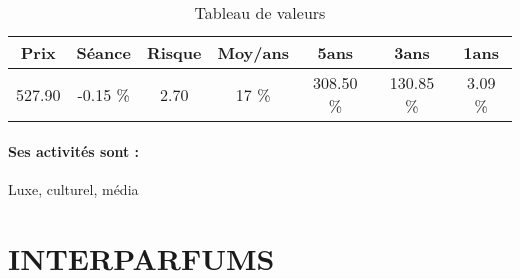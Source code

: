 \documentclass[11pt,a4paper]{report}%
\begin{document}
\begin{table}[H]
  \centering
    \begin{tabular}{|c|c|c|c|c|c|c|}
    \hline
    Prix & Séance & Risque  & Moy/ans & 5ans & 3ans & 1ans \\
    \hline
    527.90 &    -0.15 \%    & 2.70 & 17 \% & 308.50 \% & 130.85 \% & 3.09 \% \\
    \hline
    \end{tabular}%
        \label{tab:table_LVMH}%
      \caption{Tableau de valeurs}
\end{table}%

\paragraph{Ses activités sont : } Luxe, culturel, média 
    
    \newpage

\section{INTERPARFUMS}
\end{document}
